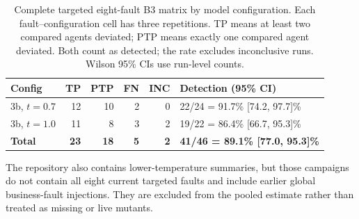 \documentclass[sigconf,review,anonymous,balance=false]{acmart}
\begin{document}
\begin{table}[t]
\centering
\caption{Complete targeted eight-fault B3 matrix by model configuration. Each
fault--configuration cell has three repetitions. TP means at least two compared
agents deviated; PTP means exactly one compared agent deviated. Both count as
detected; the rate excludes inconclusive runs. Wilson 95\% CIs use run-level
counts.}
\label{tab:b3-headline-simple}
\footnotesize
\begin{tabularx}{\columnwidth}{lrrrrY}
\toprule
\textbf{Config} & \textbf{TP} & \textbf{PTP} & \textbf{FN} & \textbf{INC} & \textbf{Detection (95\% CI)} \\
\midrule
3b, $t{=}0.7$ & 12 & 10 & 2 & 0 & 22/24 = 91.7\% [74.2, 97.7]\% \\
3b, $t{=}1.0$ & 11 & 8 & 3 & 2 & 19/22 = 86.4\% [66.7, 95.3]\% \\
\midrule
\textbf{Total} & \textbf{23} & \textbf{18} & \textbf{5} & \textbf{2} & \textbf{41/46 = 89.1\% [77.0, 95.3]\%} \\
\bottomrule
\end{tabularx}
\end{table}

The repository also contains lower-temperature summaries, but those campaigns
do not contain all eight current targeted faults and include earlier global
business-fault injections. They are excluded from the pooled estimate rather
than treated as missing or live mutants.
\end{document}
